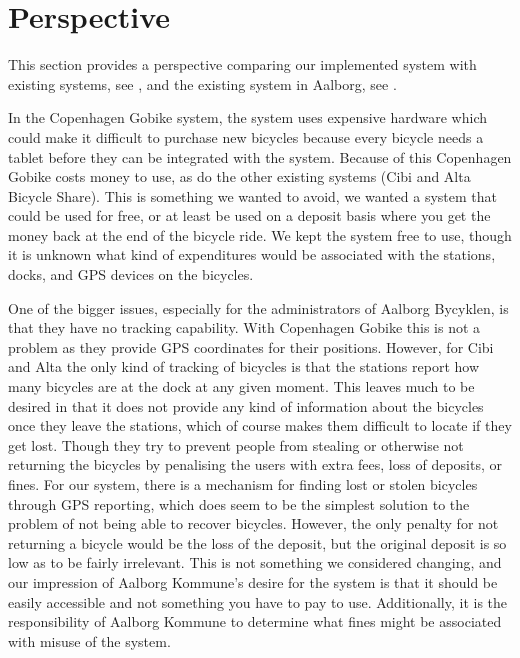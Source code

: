 \section{Perspective}
This section provides a perspective comparing our implemented system with existing systems, see , and the existing system in Aalborg, see .

In the Copenhagen Gobike system, the system uses expensive hardware which could make it difficult to purchase new bicycles because every bicycle needs a tablet before they can be integrated with the system.
Because of this Copenhagen Gobike costs money to use, as do the other existing systems (Cibi and Alta Bicycle Share). 
This is something we wanted to avoid, we wanted a system that could be used for free, or at least be used on a deposit basis where you get the money back at the end of the bicycle ride. 
We kept the system free to use, though it is unknown what kind of expenditures would be associated with the stations, docks, and GPS devices on the bicycles. 

One of the bigger issues, especially for the administrators of Aalborg Bycyklen, is that they have no tracking capability. 
With Copenhagen Gobike this is not a problem as they provide GPS coordinates for their positions.
However, for Cibi and Alta the only kind of tracking of bicycles is that the stations report how many bicycles are at the dock at any given moment.
This leaves much to be desired in that it does not provide any kind of information about the bicycles once they leave the stations, which of course makes them difficult to locate if they get lost.
Though they try to prevent people from stealing or otherwise not returning the bicycles by penalising the users with extra fees, loss of deposits, or fines.
For our system, there is a mechanism for finding lost or stolen bicycles through GPS reporting, which does seem to be the simplest solution to the problem of not being able to recover bicycles.
However, the only penalty for not returning a bicycle would be the loss of the deposit, but the original deposit is so low as to be fairly irrelevant.
This is not something we considered changing, and our impression of Aalborg Kommune's desire for the system is that it should be easily accessible and not something you have to pay to use.
Additionally, it is the responsibility of Aalborg Kommune to determine what fines might be associated with misuse of the system.

